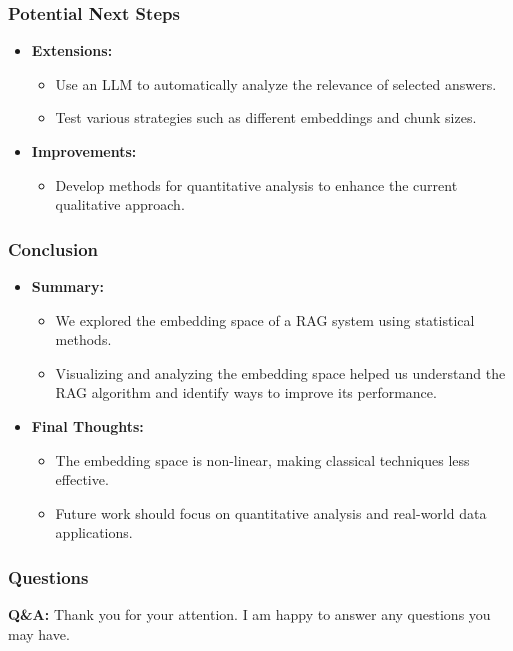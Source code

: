 \documentclass{beamer}
\begin{document}
\begin{frame}
\frametitle{Potential Next Steps}
\begin{itemize}
    \item \textbf{Extensions:} 
    \begin{itemize}
        \item Use an LLM to automatically analyze the relevance of selected answers.
        \item Test various strategies such as different embeddings and chunk sizes.
    \end{itemize}
    \item \textbf{Improvements:} 
    \begin{itemize}
        \item Develop methods for quantitative analysis to enhance the current qualitative approach.
    \end{itemize}
\end{itemize}
\end{frame}

\begin{frame}
\frametitle{Conclusion}
\begin{itemize}
    \item \textbf{Summary:} 
    \begin{itemize}
        \item We explored the embedding space of a RAG system using statistical methods.
        \item Visualizing and analyzing the embedding space helped us understand the RAG algorithm and identify ways to improve its performance.
    \end{itemize}
    \item \textbf{Final Thoughts:} 
    \begin{itemize}
        \item The embedding space is non-linear, making classical techniques less effective.
        \item Future work should focus on quantitative analysis and real-world data applications.
    \end{itemize}
\end{itemize}
\end{frame}

\begin{frame}
\frametitle{Questions}
\begin{center}
    \textbf{Q\&A:} Thank you for your attention. I am happy to answer any questions you may have.
\end{center}
\end{frame}
\end{document}
